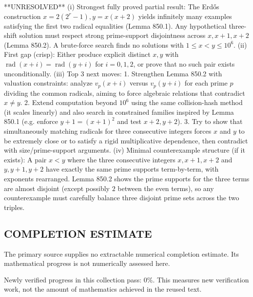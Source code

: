 **UNRESOLVED**
(i) Strongest fully proved partial result: The Erd\H{o}s construction $x=2(2^r-1),y=x(x+2)$ yields infinitely many examples satisfying the first two radical equalities (Lemma 850.1). Any hypothetical three-shift solution must respect strong prime-support disjointness across $x,x+1,x+2$ (Lemma 850.2). A brute-force search finds no solutions with $1\le x<y\le 10^6$.
(ii) First gap (crisp): Either produce explicit distinct $x,y$ with $\operatorname{rad}(x+i)=\operatorname{rad}(y+i)$ for $i=0,1,2$, or prove that no such pair exists unconditionally.
(iii) Top 3 next moves:
  1. Strengthen Lemma 850.2 with valuation constraints: analyze $v_p(x+i)$ versus $v_p(y+i)$ for each prime $p$ dividing the common radicals, aiming to force algebraic relations that contradict $x\ne y$.
  2. Extend computation beyond $10^6$ using the same collision-hash method (it scales linearly) and also search in constrained families inspired by Lemma 850.1 (e.g. enforce $y+1=(x+1)^2$ and test $x+2,y+2$).
  3. Try to show that simultaneously matching radicals for three consecutive integers forces $x$ and $y$ to be extremely close or to satisfy a rigid multiplicative dependence, then contradict with size/prime-support arguments.
(iv) Minimal counterexample structure (if it exists): A pair $x<y$ where the three consecutive integers $x,x+1,x+2$ and $y,y+1,y+2$ have exactly the same prime supports term-by-term, with exponents rearranged. Lemma 850.2 shows the prime supports for the three terms are almost disjoint (except possibly $2$ between the even terms), so any counterexample must carefully balance three disjoint prime sets across the two triples.




\subsection*{COMPLETION ESTIMATE}
The primary source supplies no extractable numerical completion estimate. Its mathematical progress is not numerically assessed here.

Newly verified progress in this collection pass: $0\%$. This measures new verification work, not the amount of mathematics achieved in the reused text.
